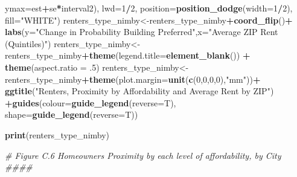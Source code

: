 \documentclass[]{article}
\newenvironment{Shaded}{\begin{snugshade}}{\end{snugshade}}
\newcommand{\CommentTok}[1]{\textcolor[rgb]{0.56,0.35,0.01}{\textit{#1}}}
\newcommand{\DataTypeTok}[1]{\textcolor[rgb]{0.13,0.29,0.53}{#1}}
\newcommand{\DecValTok}[1]{\textcolor[rgb]{0.00,0.00,0.81}{#1}}
\newcommand{\FloatTok}[1]{\textcolor[rgb]{0.00,0.00,0.81}{#1}}
\newcommand{\KeywordTok}[1]{\textcolor[rgb]{0.13,0.29,0.53}{\textbf{#1}}}
\newcommand{\NormalTok}[1]{#1}
\newcommand{\OperatorTok}[1]{\textcolor[rgb]{0.81,0.36,0.00}{\textbf{#1}}}
\newcommand{\StringTok}[1]{\textcolor[rgb]{0.31,0.60,0.02}{#1}}
\begin{document}
\begin{Shaded}
\begin{Highlighting}[]
{{{                                                           \DataTypeTok{ymax=}\NormalTok{est}\OperatorTok{+}\NormalTok{se}\OperatorTok{*}\NormalTok{interval2), }\DataTypeTok{lwd=}\DecValTok{1}\OperatorTok{/}\DecValTok{2}\NormalTok{,}
                                                       \DataTypeTok{position=}\KeywordTok{position_dodge}\NormalTok{(}\DataTypeTok{width=}\DecValTok{1}\OperatorTok{/}\DecValTok{2}\NormalTok{),  }\DataTypeTok{fill=}\StringTok{"WHITE"}\NormalTok{)}
\NormalTok{renters_type_nimby<-renters_type_nimby}\OperatorTok{+}\KeywordTok{coord_flip}\NormalTok{()}\OperatorTok{+}\StringTok{ }\KeywordTok{labs}\NormalTok{(}\DataTypeTok{y=}\StringTok{"Change in Probability Building Preferred"}\NormalTok{,}\DataTypeTok{x=}\StringTok{"Average ZIP Rent (Quintiles)"}\NormalTok{)}
\NormalTok{renters_type_nimby<-renters_type_nimby}\OperatorTok{+}\KeywordTok{theme}\NormalTok{(}\DataTypeTok{legend.title=}\KeywordTok{element_blank}\NormalTok{()) }\OperatorTok{+}\StringTok{ }\KeywordTok{theme}\NormalTok{(}\DataTypeTok{aspect.ratio =} \FloatTok{.5}\NormalTok{)}
\NormalTok{renters_type_nimby<-renters_type_nimby}\OperatorTok{+}\KeywordTok{theme}\NormalTok{(}\DataTypeTok{plot.margin=}\KeywordTok{unit}\NormalTok{(}\KeywordTok{c}\NormalTok{(}\DecValTok{0}\NormalTok{,}\DecValTok{0}\NormalTok{,}\DecValTok{0}\NormalTok{,}\DecValTok{0}\NormalTok{),}\StringTok{"mm"}\NormalTok{))}\OperatorTok{+}\StringTok{ }\KeywordTok{ggtitle}\NormalTok{(}\StringTok{"Renters, Proximity by Affordability and Average Rent by ZIP"}\NormalTok{) }\OperatorTok{+}\KeywordTok{guides}\NormalTok{(}\DataTypeTok{colour=}\KeywordTok{guide_legend}\NormalTok{(}\DataTypeTok{reverse=}\NormalTok{T), }\DataTypeTok{shape=}\KeywordTok{guide_legend}\NormalTok{(}\DataTypeTok{reverse=}\NormalTok{T))}


\KeywordTok{print}\NormalTok{(renters_type_nimby)}



\CommentTok{# Figure C.6 Homeowners Proximity by each level of affordability, by City ####}

}}}
\end{Highlighting}
\end{Shaded}
\end{document}
